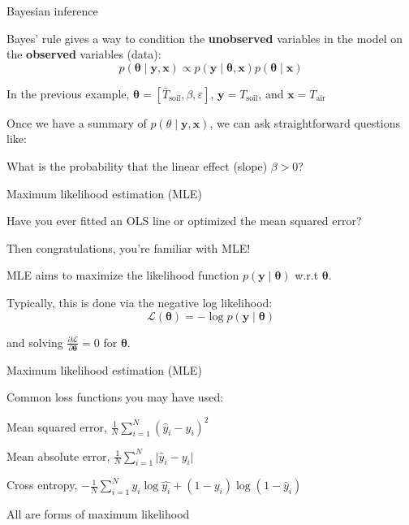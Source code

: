 \documentclass[12pt,aspectratio=169]{beamer}
\begin{document}
\begin{frame}{Bayesian inference}

Bayes' rule gives a way to condition the \textbf{unobserved} variables in the model on the \textbf{observed} variables (data):
$$
p(\boldsymbol{\theta} \mid \mathbf{y}, \mathbf{x}) \propto p(\mathbf{y} \mid \boldsymbol{\theta},\mathbf{x}) p(\boldsymbol{\theta}\mid\mathbf{x})
$$

In the previous example, $\boldsymbol{\theta} = \left[\bar{T}_{\text{soil}}, \beta, \varepsilon \right]$, $\mathbf{y} = T_{\text{soil}}$, and $\mathbf{x} = T_{\text{air}}$
\pause\newline

Once we have a summary of $p(\theta  \mid  \mathbf{y},\mathbf{x})$, we can ask straightforward questions like:
\newline

What is the probability that the linear effect (slope) $\beta > 0$?

\end{frame}

\begin{frame}{Maximum likelihood estimation (MLE)}


Have you ever fitted an OLS line or optimized the mean squared error?
\pause\newline

Then congratulations, you're familiar with MLE!
\pause\newline

MLE aims to maximize the likelihood function $p(\mathbf{y} \mid \boldsymbol{\theta})$ w.r.t $\boldsymbol{\theta}$.
\pause\newline

Typically, this is done via the negative log likelihood:
$$
\mathcal{L}(\boldsymbol{\theta}) = -\log p(\mathbf{y} \mid \boldsymbol{\theta})
$$

and solving $\frac{\partial \mathcal{L}}{\partial \boldsymbol{\theta}} = 0$ for $\boldsymbol{\theta}$.


\end{frame}

\begin{frame}{Maximum likelihood estimation (MLE)}

Common loss functions you may have used:

Mean squared error, $\frac{1}{N}\sum_{i=1}^N (\hat{y}_i - y_i)^2$
\pause\newline

Mean absolute error, $\frac{1}{N}\sum_{i=1}^N \lvert \hat{y}_i - y_i\rvert$
\pause\newline

Cross entropy, $-\frac{1}{N}\sum_{i=1}^N y_i\log \hat{y_i} + (1-y_i)\log(1-\hat{y}_i)$
\pause\newline

All are forms of maximum likelihood

\end{frame}
\end{document}
